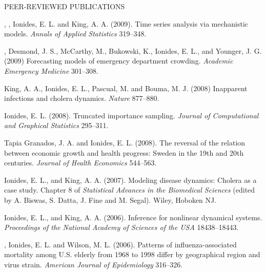 \begin{reflist}{PEER-REVIEWED PUBLICATIONS}
\item\formal{[[\bretoAOAS] ]}
 ,  , Ionides, E. L. and King, A. A. (2009).
Time series analysis via mechanistic models. 
{\em Annals of Applied Statistics} {}{\separator}319--348.

\item\formal{[[\schweiglerAEM] ]}
, Desmond, J. S., McCarthy, M., Bukowski, K., Ionides, E. L., and Younger, J. G. (2009) Forecasting models of emergency department crowding. {\em Academic Emergency Medicine} {}{\separator}301--308.

\item\formal{[[\kingNATURE] ]}
King, A. A., Ionides, E. L., Pascual, M. and Bouma, M. J. (2008) Inapparent infections and cholera dynamics. {\em Nature} {}{\separator}877--880.

\item\formal{[[\ionidesJCGS] ]}
Ionides, E. L. (2008). Truncated importance sampling. {\em Journal of Computational and Graphical Statistics} {}{\separator}295--311.

\item\formal{[[\tapiaJHE] ]} 
Tapia Granados, J. A. and Ionides, E. L. (2008). The reversal of the relation between economic growth and health progress: Sweden in the 19th and 20th centuries. {\em Journal of Health Economics} {}{\separator}544--563.

\item\formal{[[\ionidesBOOK] ]}  
Ionides, E. L.,  and King, A. A. (2007). 
 Modeling disease dynamics: Cholera as a case study.
 Chapter 8 of {\em  Statistical Advances in the Biomedical Sciences} (edited by A. Biswas, S. Datta, J. Fine and M. Segal). Wiley, Hoboken NJ.


\item\formal{[[\ionidesPNAS] ]}  
Ionides, E. L.,  and King, A. A. (2006). 
 Inference for nonlinear dynamical systems.
 {\em Proceedings of the National Academy of Sciences of the USA} {}{\separator}18438--18443.


\item\formal{[[\greeneAJE] ]} 
, Ionides, E. L. and Wilson,
  M. L. (2006). Patterns of influenza-associated mortality among
  U.S. elderly from 1968 to 1998 differ by geographical region
  and virus strain. {\em American Journal of
  Epidemiology} {}{\separator}316--326. 



\end{reflist}
